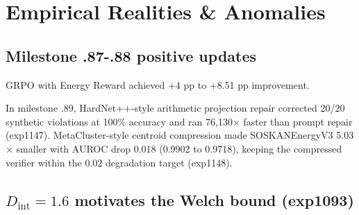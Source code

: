 \section{Empirical Realities \& Anomalies}
\subsection{Milestone .87-.88 positive updates}
GRPO with Energy Reward achieved +4 pp to +8.51 pp improvement.



In milestone .89, HardNet++-style arithmetic projection repair corrected 20/20 synthetic violations at 100\% accuracy and ran 76{,}130$\times$ faster than prompt repair (exp1147). MetaCluster-style centroid compression made SOSKANEnergyV3 5.03$\times$ smaller with AUROC drop 0.018 (0.9902 to 0.9718), keeping the compressed verifier within the 0.02 degradation target (exp1148).

\subsection{$D_{\mathrm{int}} = 1.6$ motivates the Welch bound (exp1093)}
